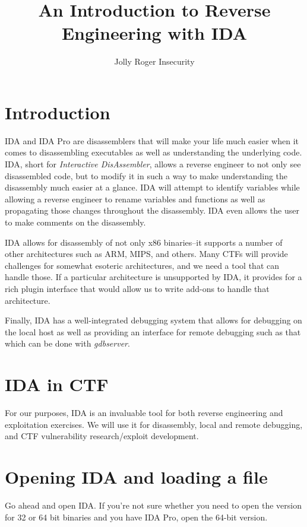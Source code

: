 \documentclass[11pt]{article}
\author{Jolly Roger Insecurity}
\date{}
\title{An Introduction to Reverse Engineering with IDA}
\begin{document}
\maketitle
\tableofcontents

\section{Introduction}
\label{sec-1}
IDA and IDA Pro are disassemblers that will make your life much easier when
it comes to disassembling executables as well as understanding the underlying
code. IDA, short for \emph{Interactive DisAssembler}, allows a reverse engineer to
not only see disassembled code, but to modify it in such a way to make
understanding the disassembly much easier at a glance. IDA will attempt to
identify variables while allowing a reverse engineer to rename variables and
functions as well as propagating those changes throughout the disassembly. IDA
even allows the user to make comments on the disassembly.

IDA allows for disassembly of not only x86 binaries--it supports a number of
other architectures such as ARM, MIPS, and others. Many CTFs will provide
challenges for somewhat esoteric architectures, and we need a tool that can
handle those. If a particular architecture is unsupported by IDA, it provides
for a rich plugin interface that would allow us to write add-ons to handle
that architecture.

Finally, IDA has a well-integrated debugging system that allows for
debugging on the local host as well as providing an interface for remote
debugging such as that which can be done with \emph{gdbserver}.

\section{IDA in CTF}
\label{sec-2}
For our purposes, IDA is an invaluable tool for both reverse engineering and
exploitation exercises. We will use it for disassembly, local and remote
debugging, and CTF vulnerability research/exploit development.

\section{Opening IDA and loading a file}
\label{sec-3}
Go ahead and open IDA. If you're not sure whether you need to open the version
for 32 or 64 bit binaries and you have IDA Pro, open the 64-bit version.
\end{document}
